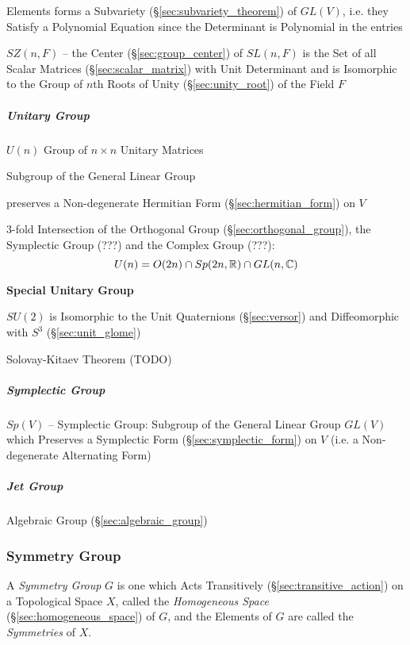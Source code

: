 Elements forms a Subvariety (\S\ref{sec:subvariety_theorem}) of $GL(V)$, i.e.
they Satisfy a Polynomial Equation since the Determinant is Polynomial in the
entries

$SZ(n,F)$ -- the Center (\S\ref{sec:group_center}) of $SL(n,F)$ is the Set of
all Scalar Matrices (\S\ref{sec:scalar_matrix}) with Unit Determinant and is
Isomorphic to the Group of $n$th Roots of Unity (\S\ref{sec:unity_root}) of the
Field $F$



\subparagraph{Unitary Group}\label{sec:unitary_group}\hfill

$U(n)$ Group of $n \times n$ Unitary Matrices

Subgroup of the General Linear Group

preserves a Non-degenerate Hermitian Form (\S\ref{sec:hermitian_form}) on $V$

3-fold Intersection of the Orthogonal Group (\S\ref{sec:orthogonal_group}), the
Symplectic Group (???) and the Complex Group (???): %
\[
  U(n) = O(2n) \cap Sp(2n,\mathbb{R}) \cap GL(n,\mathbb{C})
\]



\textbf{Special Unitary Group}

$SU(2)$ is Isomorphic to the Unit Quaternions (\S\ref{sec:versor}) and
Diffeomorphic with $S^3$ (\S\ref{sec:unit_glome})

Solovay-Kitaev Theorem (TODO)



\subparagraph{Symplectic Group}\label{sec:symplectic_group}\hfill

$Sp(V)$ -- Symplectic Group: Subgroup of the General Linear Group $GL(V)$ which
Preserves a Symplectic Form (\S\ref{sec:symplectic_form}) on $V$ (i.e. a
Non-degenerate Alternating Form)



\subparagraph{Jet Group}\label{sec:jet_group}\hfill

Algebraic Group (\S\ref{sec:algebraic_group})



\subsubsection{Symmetry Group}\label{sec:symmetry_group}

A \emph{Symmetry Group} $G$ is one which Acts Transitively
(\S\ref{sec:transitive_action}) on a Topological Space $X$, called the
\emph{Homogeneous Space} (\S\ref{sec:homogeneous_space}) of $G$, and the Elements
of $G$ are called the \emph{Symmetries} of $X$.

